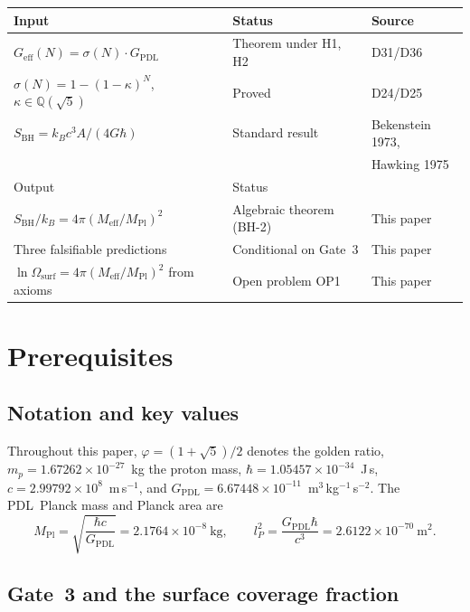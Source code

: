 \documentclass[11pt,a4paper]{article}
\theoremstyle{definition}
\newcommand{\PDL}{\textnormal{PDL}}
\newcommand{\vp}{\varphi}
\newcommand{\kap}{\kappa}
\newcommand{\sig}{\sigma}
\newcommand{\GPDL}{G_{\mathrm{PDL}}}
\newcommand{\Geff}{G_{\mathrm{eff}}}
\newcommand{\hb}{\hbar}
\newcommand{\SBH}{S_{\mathrm{BH}}}
\newcommand{\Meff}{M_{\mathrm{eff}}}
\newcommand{\MPl}{M_{\mathrm{Pl}}}
\newcommand{\lP}{l_P}
\newcommand{\Omsurf}{\Omega_{\mathrm{surf}}}
\begin{document}
\begin{center}
\begin{tabular}{lll}
\toprule
Input & Status & Source \\
\midrule
$\Geff(N) = \sig(N)\cdot\GPDL$ & Theorem under H1, H2 & D31/D36 \\
$\sig(N) = 1-(1-\kap)^N$, $\kap\in\mathbb{Q}(\sqrt{5})$ & Proved & D24/D25 \\
$\SBH = k_B c^3 A/(4G\hb)$ & Standard result & Bekenstein 1973,\\
 & & Hawking 1975 \\
\midrule
Output & Status & \\
\midrule
$\SBH/k_B = 4\pi(\Meff/\MPl)^2$ & Algebraic theorem (BH-2) & This paper \\
Three falsifiable predictions & Conditional on Gate~3 & This paper \\
$\ln\Omsurf = 4\pi(\Meff/\MPl)^2$ from axioms & Open problem OP1 & This paper \\
\bottomrule
\end{tabular}
\end{center}

\section{Prerequisites}
\label{sec:prereq}

\subsection{Notation and key values}

Throughout this paper, $\vp = (1+\sqrt{5})/2$ denotes the golden ratio,
$m_p = 1.67262\times10^{-27}$~kg the proton mass, $\hb = 1.05457\times10^{-34}$~J\,s,
$c = 2.99792\times10^8$~m\,s$^{-1}$, and $\GPDL = 6.67448\times10^{-11}$~m$^3$\,kg$^{-1}$\,s$^{-2}$.
The \PDL\ Planck mass and Planck area are
\begin{equation}
\MPl = \sqrt{\frac{\hb c}{\GPDL}} = 2.1764\times10^{-8}~\text{kg},
\qquad
\lP^2 = \frac{\GPDL\hb}{c^3} = 2.6122\times10^{-70}~\text{m}^2.
\label{eq:planck}
\end{equation}

\subsection{Gate~3 and the surface coverage fraction}
\end{document}
